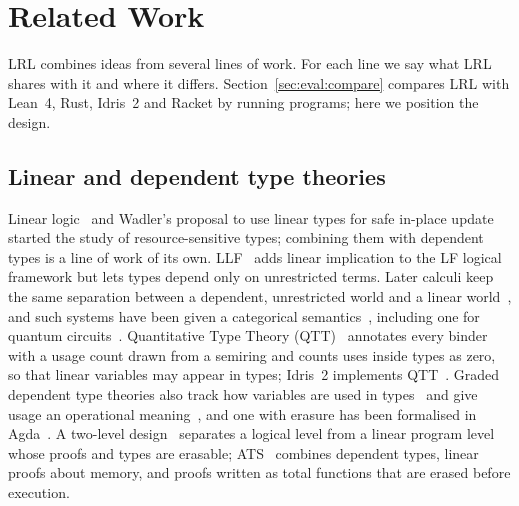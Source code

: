 \section{Related Work}\label{sec:related}

LRL combines ideas from several lines of work.
For each line we say what LRL shares with it and where it differs.
Section~\ref{sec:eval:compare} compares LRL with Lean~4, Rust, Idris~2 and Racket by running programs; here we position the design.

\subsection{Linear and dependent type theories}\label{sec:related:lindep}

Linear logic~\cite{girard1987linear} and Wadler's proposal to use linear types for safe in-place update~\cite{wadler1990} started the study of resource-sensitive types; combining them with dependent types is a line of work of its own.
LLF~\cite{cervesato2002llf} adds linear implication to the LF logical framework but lets types depend only on unrestricted terms.
Later calculi keep the same separation between a dependent, unrestricted world and a linear world~\cite{krishnaswami2015integrating}, and such systems have been given a categorical semantics~\cite{vakar2014syntax,vakar2015categorical}, including one for quantum circuits~\cite{fu2022linear}.
Quantitative Type Theory (QTT)~\cite{mcbride2016,atkey2018} annotates every binder with a usage count drawn from a semiring and counts uses inside types as zero, so that linear variables may appear in types; Idris~2 implements QTT~\cite{brady2021}.
Graded dependent type theories also track how variables are used in types~\cite{moon2021grtt} and give usage an operational meaning~\cite{choudhury2021grad}, and one with erasure has been formalised in Agda~\cite{abel2023graded}.
A two-level design~\cite{fu2026twolevel} separates a logical level from a linear program level whose proofs and types are erasable; ATS~\cite{xi2007ats,zhu2005stateful,chen2005combining} combines dependent types, linear proofs about memory, and proofs written as total functions that are erased before execution.

